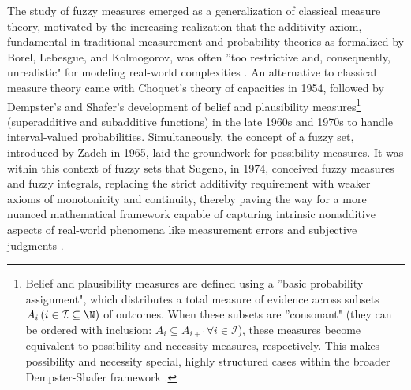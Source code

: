 









The study of fuzzy measures emerged as a generalization of classical measure theory, motivated by the increasing realization that the additivity axiom, fundamental in traditional measurement and probability theories as formalized by Borel, Lebesgue, and Kolmogorov, was often ''too restrictive and, consequently, unrealistic" for modeling real-world complexities \cite[p.~10]{FuzzyMeasureHistory}. An alternative to classical measure theory came with Choquet's theory of capacities in 1954, followed by Dempster's and Shafer's development of belief and plausibility measures\footnote{Belief and plausibility measures are defined using a ''basic probability assignment", which distributes a total measure of evidence across subsets $A_i \,(i\in \mathcal{I}\subseteq \N)$ of outcomes. When these subsets are ''consonant" (they can be ordered with inclusion: $A_i \subseteq  A_{i+1}\forall i\in \mathcal{I}$), these measures become equivalent to possibility and necessity measures, respectively. This makes possibility and necessity special, highly structured cases within the broader Dempster-Shafer framework \cite[Thm.~3.23, Thm.~3.25]{FuzzyMeasureHistory}.} (superadditive and subadditive functions) in the late 1960s and 1970s to handle interval-valued probabilities. Simultaneously, the concept of a fuzzy set, introduced by Zadeh in 1965, laid the groundwork for possibility measures. It was within this context of fuzzy sets that Sugeno, in 1974, conceived fuzzy measures and fuzzy integrals, replacing the strict additivity requirement with weaker axioms of monotonicity and continuity, thereby paving the way for a more nuanced mathematical framework capable of capturing intrinsic nonadditive aspects of real-world phenomena like measurement errors and subjective judgments \cite[p.~13]{FuzzyMeasureHistory}.\\


